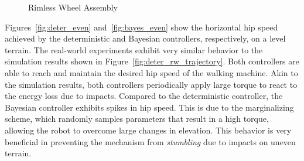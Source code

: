 \begin{figure}
    \vspace{-5mm}
     \begin{center}
     \vspace{-5mm}
     \end{center}
     \caption{Rimless Wheel Assembly}
     \label{fig:hardware}
     \vspace{-5mm}
\end{figure}

Figures~\ref{fig:deter_even} and~\ref{fig:bayes_even} show the horizontal hip
speed achieved by the deterministic and Bayesian controllers, respectively, on
a level terrain.
%
The real-world experiments exhibit very similar behavior to the simulation
results shown in Figure~\ref{fig:deter_rw_trajectory}.
%
Both controllers are able to reach and maintain the desired hip speed of the
walking machine.
%
Akin to the simulation results, both controllers periodically apply large torque
to react to the energy loss due to impacts.
%
Compared to the deterministic controller, the Bayesian controller exhibits spikes
in hip speed.
%
This is due to the marginalizing scheme, which randomly samples parameters that
result in a high torque, allowing the robot to overcome large changes in elevation.
%
This behavior is very beneficial in preventing the mechanism from
\textit{stumbling} due to impacts on uneven terrain. 
%
%

